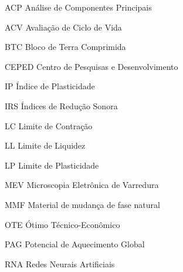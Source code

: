 



\begin{siglas}
    \item [ACP] Análise de Componentes Principais
    \item [ACV] Avaliação de Ciclo de Vida
    \item [BTC] Bloco de Terra Comprimida
    \item [CEPED] Centro de Pesquisas e Desenvolvimento
    \item [IP] Índice de Plasticidade
    \item [IRS] Índices de Redução Sonora
    \item [LC] Limite de Contração
    \item [LL] Limite de Liquidez
    \item [LP] Limite de Plasticidade
    \item [MEV] Microscopia Eletrônica de Varredura
    \item [MMF] Material de mudança de fase natural
    \item [OTE] Ótimo Técnico-Econômico
    \item [PAG] Potencial de Aquecimento Global
    \item [RNA] Redes Neurais Artificiais
\end{siglas}